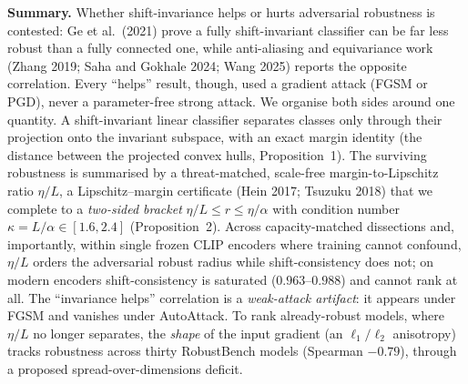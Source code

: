 \documentclass[10pt]{article}
\newcommand{\etaL}{\ensuremath{\eta/L}}
\begin{document}
\begin{tcolorbox}[colback=blue!3,colframe=blue!40!black,boxrule=0.5pt,arc=2pt,left=4pt,right=4pt,top=3pt,bottom=3pt]
\small
\textbf{Summary.} Whether shift-invariance helps or hurts adversarial robustness is contested: Ge et al.\ (2021) prove a fully shift-invariant classifier can be far less robust than a fully connected one, while anti-aliasing and equivariance work (Zhang 2019; Saha and Gokhale 2024; Wang 2025) reports the opposite correlation. Every ``helps'' result, though, used a gradient attack (FGSM or PGD), never a parameter-free strong attack. We organise both sides around one quantity. A shift-invariant linear classifier separates classes only through their projection onto the invariant subspace, with an exact margin identity (the distance between the projected convex hulls, Proposition~1). The surviving robustness is summarised by a threat-matched, scale-free margin-to-Lipschitz ratio \etaL, a Lipschitz--margin certificate (Hein 2017; Tsuzuku 2018) that we complete to a \emph{two-sided bracket} $\eta/L\le r\le\eta/\alpha$ with condition number $\kappa=L/\alpha\in[1.6,2.4]$ (Proposition~2). Across capacity-matched dissections and, importantly, within single frozen CLIP encoders where training cannot confound, \etaL{} orders the adversarial robust radius while shift-consistency does not; on modern encoders shift-consistency is saturated ($0.963$--$0.988$) and cannot rank at all. The ``invariance helps'' correlation is a \emph{weak-attack artifact}: it appears under FGSM and vanishes under AutoAttack. To rank already-robust models, where \etaL{} no longer separates, the \emph{shape} of the input gradient (an $\ell_1/\ell_2$ anisotropy) tracks robustness across thirty RobustBench models (Spearman $-0.79$), through a proposed spread-over-dimensions deficit.
\end{tcolorbox}
\end{document}
